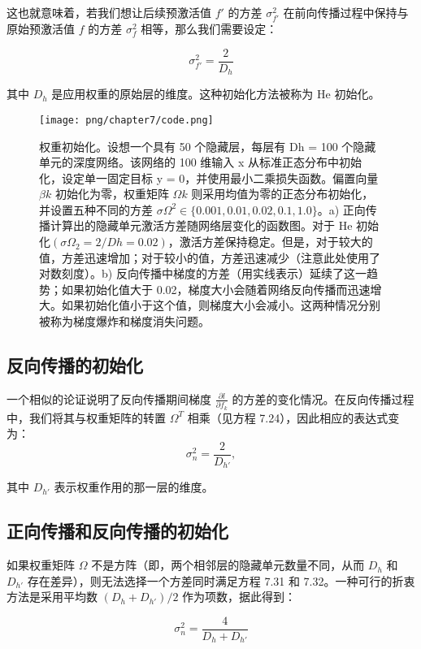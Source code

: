 这也就意味着，若我们想让后续预激活值 \(f'\) 的方差 \(\sigma_{f'}^2\) 在前向传播过程中保持与原始预激活值 \(f\) 的方差 \(\sigma_f^2\) 相等，那么我们需要设定：


\begin{equation}
\sigma_{f'}^2 = \frac{2}{D_h} 
\end{equation}

其中 \(D_h\) 是应用权重的原始层的维度。这种初始化方法被称为 He 初始化。

\begin{figure}[ht!]
\centering
\texttt{[image: png/chapter7/code.png]}
\caption{权重初始化。设想一个具有 50 个隐藏层，每层有 Dh = 100 个隐藏单元的深度网络。该网络的 100 维输入 x 从标准正态分布中初始化，设定单一固定目标 y = 0，并使用最小二乘损失函数。偏置向量 \(\beta k\) 初始化为零，权重矩阵 \(\Omega k\) 则采用均值为零的正态分布初始化，并设置五种不同的方差 \(\sigma \Omega^2 \in \{0.001, 0.01, 0.02, 0.1, 1.0\}\)。a) 正向传播计算出的隐藏单元激活方差随网络层变化的函数图。对于 He 初始化\((\sigma \Omega_2 = 2/Dh = 0.02)\)，激活方差保持稳定。但是，对于较大的值，方差迅速增加；对于较小的值，方差迅速减少（注意此处使用了对数刻度）。b) 反向传播中梯度的方差（用实线表示）延续了这一趋势；如果初始化值大于 0.02，梯度大小会随着网络反向传播而迅速增大。如果初始化值小于这个值，则梯度大小会减小。这两种情况分别被称为梯度爆炸和梯度消失问题。}
\end{figure}

\subsection{反向传播的初始化}
一个相似的论证说明了反向传播期间梯度 \(\frac{\partial l}{\partial f_k}\) 的方差的变化情况。在反向传播过程中，我们将其与权重矩阵的转置 \(\Omega^T\) 相乘（见方程 7.24），因此相应的表达式变为：
\begin{equation}
\sigma^2_n = \frac{2}{D_{h'}}, 
\end{equation}

其中 \(D_{h'}\) 表示权重作用的那一层的维度。
\subsection{正向传播和反向传播的初始化}
如果权重矩阵 \( \Omega \) 不是方阵（即，两个相邻层的隐藏单元数量不同，从而 \( D_h \) 和 \( D_{h'} \) 存在差异），则无法选择一个方差同时满足方程 7.31 和 7.32。一种可行的折衷方法是采用平均数 \( (D_h + D_{h'})/2 \) 作为项数，据此得到：

\begin{equation}
\sigma^2_n = \frac{4}{D_h + D_{h'}} 
\end{equation}

